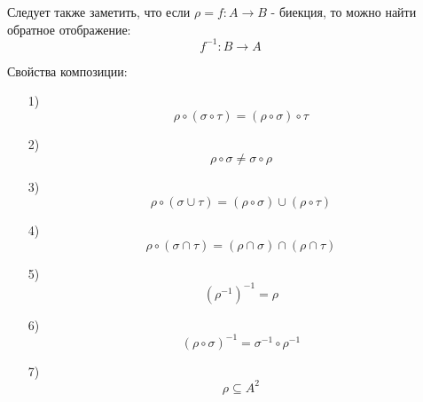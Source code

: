 Следует также заметить, что если $\rho=f:A\to B$ - биекция, то можно найти обратное
отображение: \[
f^{-1}:B\to A
\] 

\medskip

Свойства композиции:
\begin{itemize}
	\item[1)] \[
	\rho \circ (\sigma \circ \tau) = (\rho \circ \sigma) \circ \tau
	\]
\item[2)] \[
\rho \circ \sigma \neq \sigma \circ \rho
\]
\item[3)] \[
\rho \circ (\sigma \cup \tau) = (\rho \circ \sigma) \cup (\rho \circ \tau)
\] 
\item[4)] \[
\rho \circ (\sigma \cap \tau) = (\rho \cap \sigma) \cap (\rho \cap \tau)
\]
\item[5)] \[
		(\rho^{-1})^{-1}=\rho
\]
\item[6)] \[
		(\rho \circ \sigma)^{-1} = \sigma^{-1} \circ \rho^{-1}
\]
\item[7)] \[
\rho \subseteq A^2
\] 
\end{itemize}


